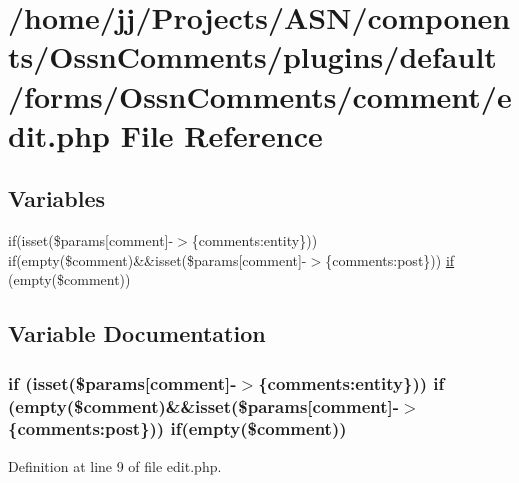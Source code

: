 \hypertarget{components_2_ossn_comments_2plugins_2default_2forms_2_ossn_comments_2comment_2edit_8php}{}\section{/home/jj/\+Projects/\+A\+S\+N/components/\+Ossn\+Comments/plugins/default/forms/\+Ossn\+Comments/comment/edit.php File Reference}
\label{components_2_ossn_comments_2plugins_2default_2forms_2_ossn_comments_2comment_2edit_8php}
\subsection*{Variables}
\begin{DoxyCompactItemize}
\item 
if(isset(\$params\mbox{[}\textquotesingle{}comment\textquotesingle{}\mbox{]}-\/$>$\{\textquotesingle{}comments\+:entity\textquotesingle{}\})) if(empty(\$comment)\&\&isset(\$params\mbox{[}\textquotesingle{}comment\textquotesingle{}\mbox{]}-\/$>$\{\textquotesingle{}comments\+:post\textquotesingle{}\})) \hyperlink{components_2_ossn_comments_2plugins_2default_2forms_2_ossn_comments_2comment_2edit_8php_ac93a590dc79c764da60afcd074163531}{if} (empty(\$comment))
\end{DoxyCompactItemize}


\subsection{Variable Documentation}
\subsubsection[{\texorpdfstring{if}{if}}]{\setlength{\rightskip}{0pt plus 5cm}if (isset(\$params\mbox{[}\textquotesingle{}comment\textquotesingle{}\mbox{]}-\/$>$\{\textquotesingle{}comments\+:entity\textquotesingle{}\})) if (empty(\$comment)\&\&isset(\$params\mbox{[}\textquotesingle{}comment\textquotesingle{}\mbox{]}-\/$>$\{\textquotesingle{}comments\+:post\textquotesingle{}\})) if(empty(\$comment))}\hypertarget{components_2_ossn_comments_2plugins_2default_2forms_2_ossn_comments_2comment_2edit_8php_ac93a590dc79c764da60afcd074163531}{}\label{components_2_ossn_comments_2plugins_2default_2forms_2_ossn_comments_2comment_2edit_8php_ac93a590dc79c764da60afcd074163531}


Definition at line 9 of file edit.\+php.

